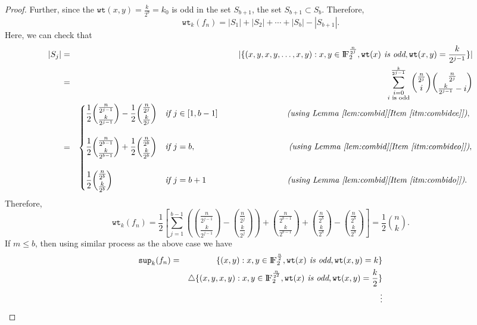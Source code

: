 \documentclass{article}[12pt]
\newcommand{\FF}{{\rm I\!F}}
\newcommand{\wt}{\mathtt{wt}}
\newcommand{\spt}{\mathtt{sup}}
\begin{document}
\begin{proof}
Further, since the $\wt(x,y) = \frac{k}{2^b} = k_0$ is odd in the set $S_{b+1}$, the set $S_{b+1} \subset S_b$. Therefore, 
$$\wt_k(f_n) = |S_1| + |S_2| + \cdots + |S_b| - |S_{b+1}|.$$
Here, we can check that 
\begin{eqnarray*}
|S_j| & = & \displaystyle{|\{(x,y,x,y, \ldots,x,y) : x,y \in \FF_2^{\frac{n}{2^j}}, \wt(x) \textit{ is odd},  \wt(x,y) = \frac{k}{2^{j-1}}\}|} \\
    & = & \displaystyle{\sum_{\substack{i = 0 \\ i \text{ is odd}}}^\frac{k}{2^{j-1}}{\frac{n}{2^j} \choose i}{\frac{n}{2^j} \choose \frac{k}{2^{j-1}}-i}} \\
    & = & \begin{cases}
            \displaystyle{\frac{1}{2}{\frac{n}{2^{j-1}} \choose \frac{k}{2^{j-1}}} - \frac{1}{2}{\frac{n}{2^j} \choose \frac{k}{2^j}}} & \textit{if } j \in [1,b-1]   \hspace{1.15in} \textit{(using Lemma~\ref{lem:combid}[Item~\ref{itm:combidee}])},\\ & \\
            \displaystyle{\frac{1}{2}{\frac{n}{2^{b-1}} \choose \frac{k}{2^{b-1}}} + \frac{1}{2}{\frac{n}{2^b} \choose \frac{k}{2^b}}} & \textit{if } j = b,\hspace{1.55in} \textit{(using Lemma~\ref{lem:combid}[Item~\ref{itm:combideo}])},\\ & \\
            \displaystyle{\frac{1}{2}{\frac{n}{2^b} \choose \frac{k}{2^b}}} & \textit{if } j = b+1 \hspace{1.35in} \textit{(using Lemma~\ref{lem:combid}[Item~\ref{itm:combido}])}.
    \end{cases}
\end{eqnarray*}
Therefore,
$$\displaystyle{\wt_k(f_n) = \frac{1}{2}\left[\sum_{j = 1}^{b-1} \left({\frac{n}{2^{j-1}} \choose \frac{k}{2^{j-1}}} - {\frac{n}{2^j} \choose \frac{k}{2^j}}\right) + {\frac{n}{2^{b-1}} \choose \frac{k}{2^{b-1}}} + {\frac{n}{2^b} \choose \frac{k}{2^b}} - {\frac{n}{2^b} \choose \frac{k}{2^b}}\right] = \frac{1}{2}{n \choose k}}.$$
If $m \leq b$, then using similar process as the above case we have
\begin{eqnarray*}
\spt_k(f_n) & = &\{(x,y) : x,y \in \FF_2^{\frac{n}{2}}, \wt(x) \textit{ is odd}, \wt(x,y) = k\} \\ & &\triangle \{(x,y,x,y) : x,y \in \FF_2^{\frac{n}{2^2}}, \wt(x) \textit{ is odd},  \wt(x,y) = \frac{k}{2}\} \\ 
& & \vdots \\

\end{eqnarray*}
\end{proof}
\end{document}
